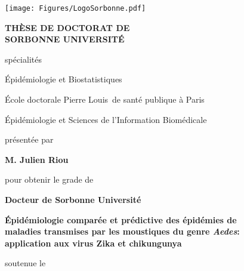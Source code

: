 \documentclass[a4paper,12pt]{book}
\numberwithin{equation}{chapter}
\numberwithin{figure}{chapter}
\numberwithin{table}{chapter}
\begin{document}
\frontmatter %
\thispagestyle{empty}


\texttt{[image: Figures/LogoSorbonne.pdf]}

\begin{center}
\vspace*{.4cm}

{\bf  TH\`ESE DE DOCTORAT DE \\[.5em] SORBONNE UNIVERSITÉ }

\vspace*{.6cm}
spécialités 
 
Épidémiologie et Biostatistiques


\vspace*{.6cm}
École doctorale \guillemotleft Pierre Louis\guillemotright\ de santé publique à Paris

{\small Épidémiologie et Sciences de l'Information Biomédicale}

\vspace*{.8cm}
présentée par

\vspace*{0.2cm}
{\bf M. Julien Riou}

\vspace*{.6cm}
pour obtenir le grade de

\vspace*{0.2cm}
{\bf Docteur de Sorbonne Université}

\vspace*{.8cm}
\begin{flushleft}
	\underline{}
\end{flushleft}

{\bf Épidémiologie comparée et prédictive des épidémies de \\
\vspace*{0.2cm}
maladies transmises par les moustiques du genre {\em Aedes}: \\
\vspace*{0.2cm}
application aux virus Zika et chikungunya}

\end{center}

\vspace*{.6cm} 
soutenue le 
\end{document}

